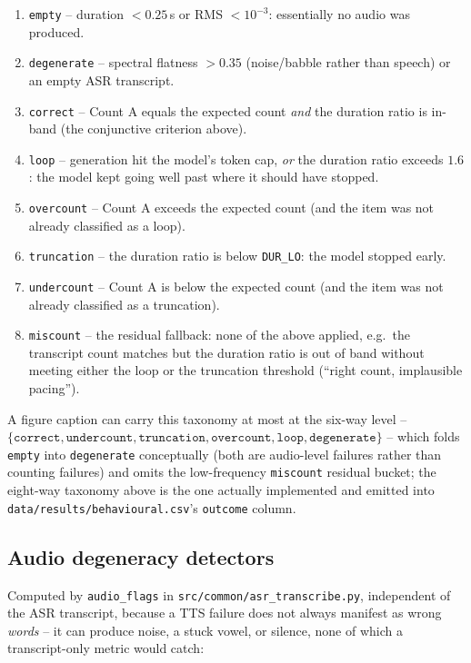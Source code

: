 \documentclass[11pt]{article}
\begin{document}
\begin{enumerate}
\item \texttt{empty} -- duration $<0.25\,$s or RMS $<10^{-3}$: essentially no
  audio was produced.
\item \texttt{degenerate} -- spectral flatness $>0.35$ (noise/babble rather
  than speech) or an empty ASR transcript.
\item \texttt{correct} -- Count A equals the expected count \emph{and} the
  duration ratio is in-band (the conjunctive criterion above).
\item \texttt{loop} -- generation hit the model's token cap, \emph{or} the
  duration ratio exceeds $1.6$: the model kept going well past where it
  should have stopped.
\item \texttt{overcount} -- Count A exceeds the expected count (and the item
  was not already classified as a loop).
\item \texttt{truncation} -- the duration ratio is below \texttt{DUR\_LO}:
  the model stopped early.
\item \texttt{undercount} -- Count A is below the expected count (and the
  item was not already classified as a truncation).
\item \texttt{miscount} -- the residual fallback: none of the above applied,
  e.g.\ the transcript count matches but the duration ratio is out of band
  without meeting either the loop or the truncation threshold (``right count,
  implausible pacing'').
\end{enumerate}

A figure caption can carry this taxonomy at most at the six-way level --
$\{\texttt{correct}, \texttt{undercount}, \texttt{truncation},
\texttt{overcount}, \texttt{loop}, \texttt{degenerate}\}$ -- which folds
\texttt{empty} into \texttt{degenerate} conceptually (both are audio-level
failures rather than counting failures) and omits the low-frequency
\texttt{miscount} residual bucket; the eight-way taxonomy above is the one
actually implemented and emitted into \texttt{data/results/behavioural.csv}'s
\texttt{outcome} column.

\subsection{Audio degeneracy detectors}

Computed by \texttt{audio\_flags} in \texttt{src/common/asr\_transcribe.py},
independent of the ASR transcript, because a TTS failure does not always
manifest as wrong \emph{words} -- it can produce noise, a stuck vowel, or
silence, none of which a transcript-only metric would catch:
\end{document}
